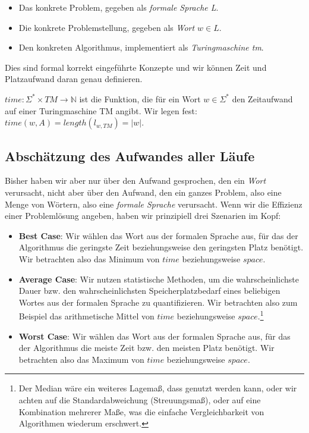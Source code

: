 \begin{itemize}
    \item Das konkrete Problem, gegeben als \emph{formale Sprache L}.
    \item Die konkrete Problemstellung, gegeben als \emph{Wort $w \in L$}.
    \item Den konkreten Algorithmus, implementiert als \emph{Turingmaschine tm}.
\end{itemize}

Dies sind formal korrekt eingeführte Konzepte
und wir können Zeit und Platzaufwand daran genau definieren.

$time: \Sigma^* \times TM \rightarrow \mathbb{N}$ ist die Funktion,
die für ein Wort $w \in \Sigma^*$ den Zeitaufwand auf einer Turingmaschine TM angibt.
Wir legen fest: $time(w,A) =  length(l_{w,TM}) = |w|$.
        
       

\subsection{Abschätzung des Aufwandes aller Läufe}

Bisher haben wir aber nur über den Aufwand gesprochen,
den ein \emph{Wort} verursacht,
nicht aber über den Aufwand,
den ein ganzes Problem, also eine Menge von Wörtern,
also eine \emph{formale Sprache} verursacht.
Wenn wir die Effizienz einer Problemlösung angeben,
haben wir prinzipiell drei Szenarien im Kopf:
\begin{itemize}
    \item \textbf{Best Case}: Wir wählen das Wort aus der formalen Sprache aus,
        für das der Algorithmus die geringste Zeit
        beziehungsweise den geringsten Platz benötigt.
        Wir betrachten also das Minimum von $time$ beziehungsweise $space$.
    \item \textbf{Average Case}: Wir nutzen statistische Methoden, um die wahrscheinlichste
        Dauer bzw. den wahrscheinlichsten Speicherplatzbedarf eines beliebigen Wortes aus
        der formalen Sprache zu quantifizieren.
        Wir betrachten also zum Beispiel das arithmetische Mittel von $time$ beziehungsweise
        $space$.\footnote{Der Median wäre ein weiteres Lagemaß, dass genutzt werden kann,
        oder wir achten auf die Standardabweichung (Streuungsmaß), oder auf eine Kombination 
        mehrerer Maße, was die einfache Vergleichbarkeit von Algorithmen wiederum erschwert.}
    \item \textbf{Worst Case}: Wir wählen das Wort aus der formalen Sprache aus,
        für das der Algorithmus die meiste Zeit bzw. den meisten Platz benötigt.
        Wir betrachten also das Maximum von $time$ beziehungsweise $space$.
\end{itemize} 

